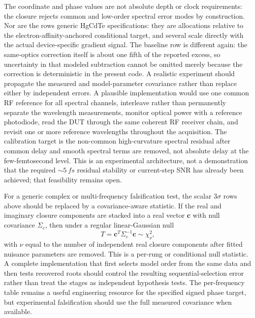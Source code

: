 \documentclass[11pt]{article}
\begin{document}
The coordinate and phase values are not absolute depth or clock requirements: the closure rejects common and low-order spectral error modes by construction. Nor are the rows generic HgCdTe specifications: they are allocations relative to the electron-affinity-anchored conditional target, and several scale directly with the actual device-specific gradient signal. The baseline row is different again: the same-optics correction itself is about one fifth of the reported excess, so uncertainty in that modeled subtraction cannot be omitted merely because the correction is deterministic in the present code. A realistic experiment should propagate the measured and model-parameter covariance rather than replace either by independent errors. A plausible implementation would use one common RF reference for all spectral channels, interleave rather than permanently separate the wavelength measurements, monitor optical power with a reference photodiode, read the DUT through the same coherent RF receiver chain, and revisit one or more reference wavelengths throughout the acquisition. The calibration target is the non-common high-curvature spectral residual after common delay and smooth spectral terms are removed, not absolute delay at the few-femtosecond level. This is an experimental architecture, not a demonstration that the required $\sim5~\si{fs}$ residual stability or current-step SNR has already been achieved; that feasibility remains open.

For a generic complex or multi-frequency falsification test, the scalar $3\sigma$ rows above should be replaced by a covariance-aware statistic. If the real and imaginary closure components are stacked into a real vector $\mathbf c$ with null covariance $\Sigma_c$, then under a regular linear-Gaussian null
\begin{equation}
\boxed{T=\mathbf c^{T}\Sigma_c^{-1}\mathbf c\sim\chi^2_{\nu},}
\label{eq:complex_closure_stat}
\end{equation}
with $\nu$ equal to the number of independent real closure components after fitted nuisance parameters are removed. This is a per-rung or conditional null statistic. A complete implementation that first selects model order from the same data and then tests recovered roots should control the resulting sequential-selection error rather than treat the stages as independent hypothesis tests. The per-frequency table remains a useful engineering resource for the specified signed phase target, but experimental falsification should use the full measured covariance when available.
\end{document}
